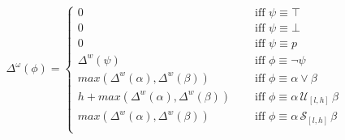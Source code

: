 \documentclass[]{llncs}
\begin{document}
\begin{align*}
\Delta^{\omega}(\phi) = \left\lbrace
\begin{aligned}
0 & \quad \text{ iff } \psi \equiv \top \\
0 & \quad \text{ iff } \psi \equiv \bot \\
0 & \quad \text{ iff } \psi \equiv p \\
\Delta^w(\psi) & \quad \text{ iff } \phi \equiv \neg \psi \\
max(\Delta^w(\alpha),\Delta^w(\beta)) & \quad \text{ iff } \phi \equiv \alpha \vee \beta \\
h + max(\Delta^w(\alpha),\Delta^w(\beta)) & \quad \text{ iff } \phi \equiv \alpha\, \mathcal{U}_{[l,h]}\, \beta \\
max(\Delta^w(\alpha),\Delta^w(\beta)) & \quad \text{ iff } \phi \equiv \alpha\, \mathcal{S}_{[l,h]}\, \beta \\
\end{aligned} \right. 
\end{align*}
\end{document}
